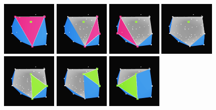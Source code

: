 \documentclass[]{article}
\begin{document}
\begin{figure}[H]
	\begin{center}
		\includegraphics[width=2.65cm]{qh3d/demo3d/add_rem_10.png}
		\includegraphics[width=2.65cm]{qh3d/demo3d/add_rem_9.png}
		\includegraphics[width=2.65cm]{qh3d/demo3d/add_rem_8.png}
		\includegraphics[width=2.65cm]{qh3d/demo3d/add_rem_7.png}
		\includegraphics[width=2.65cm]{qh3d/demo3d/add_rem_6.png}
		\includegraphics[width=2.65cm]{qh3d/demo3d/add_rem_5.png}
		\includegraphics[width=2.65cm]{qh3d/demo3d/add_rem_4.png}

\end{center}
\end{figure}
\end{document}

